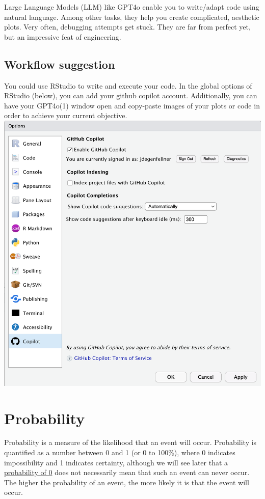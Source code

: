 \documentclass[
]{book}
\newcommand{\pandocbounded}[1]{#1}
\begin{document}
Large Language Models (LLM) like GPT4o enable you to write/adapt code using natural language. Among other tasks, they help you create complicated, aesthetic plots. Very often, debugging attempts get stuck. They are far from perfect yet, but an impressive feat of engineering.

\section{Workflow suggestion}\label{workflow-suggestion}

You could use RStudio to write and execute your code. In the global options of RStudio (below), you can add your github copilot account. Additionally, you can have your GPT4o(1) window open and copy-paste images of your plots or code in order to achieve your current objective.
\pandocbounded{\includegraphics[keepaspectratio]{./images/RStudio_Global_Options.png}}

\chapter{Probability}\label{probs}

Probability is a measure of the likelihood that an event will occur. Probability is quantified as a number between 0 and 1 (or 0 to 100\%),
where 0 indicates impossibility and 1 indicates certainty, although we will see later that a \href{https://stats.stackexchange.com/questions/273382/how-can-the-probability-of-each-point-be-zero-in-continuous-random-variable}{probability of 0} does not necessarily mean that such an event can never occur.
The higher the probability of an event, the more likely it is that the event will occur.
\end{document}
